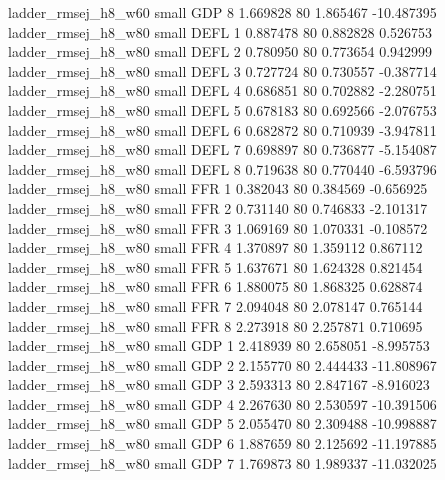      ladder_rmsej_h8_w60      small      GDP                 8 1.669828 80       1.865467         -10.487395
     ladder_rmsej_h8_w80      small     DEFL                 1 0.887478 80       0.882828           0.526753
     ladder_rmsej_h8_w80      small     DEFL                 2 0.780950 80       0.773654           0.942999
     ladder_rmsej_h8_w80      small     DEFL                 3 0.727724 80       0.730557          -0.387714
     ladder_rmsej_h8_w80      small     DEFL                 4 0.686851 80       0.702882          -2.280751
     ladder_rmsej_h8_w80      small     DEFL                 5 0.678183 80       0.692566          -2.076753
     ladder_rmsej_h8_w80      small     DEFL                 6 0.682872 80       0.710939          -3.947811
     ladder_rmsej_h8_w80      small     DEFL                 7 0.698897 80       0.736877          -5.154087
     ladder_rmsej_h8_w80      small     DEFL                 8 0.719638 80       0.770440          -6.593796
     ladder_rmsej_h8_w80      small      FFR                 1 0.382043 80       0.384569          -0.656925
     ladder_rmsej_h8_w80      small      FFR                 2 0.731140 80       0.746833          -2.101317
     ladder_rmsej_h8_w80      small      FFR                 3 1.069169 80       1.070331          -0.108572
     ladder_rmsej_h8_w80      small      FFR                 4 1.370897 80       1.359112           0.867112
     ladder_rmsej_h8_w80      small      FFR                 5 1.637671 80       1.624328           0.821454
     ladder_rmsej_h8_w80      small      FFR                 6 1.880075 80       1.868325           0.628874
     ladder_rmsej_h8_w80      small      FFR                 7 2.094048 80       2.078147           0.765144
     ladder_rmsej_h8_w80      small      FFR                 8 2.273918 80       2.257871           0.710695
     ladder_rmsej_h8_w80      small      GDP                 1 2.418939 80       2.658051          -8.995753
     ladder_rmsej_h8_w80      small      GDP                 2 2.155770 80       2.444433         -11.808967
     ladder_rmsej_h8_w80      small      GDP                 3 2.593313 80       2.847167          -8.916023
     ladder_rmsej_h8_w80      small      GDP                 4 2.267630 80       2.530597         -10.391506
     ladder_rmsej_h8_w80      small      GDP                 5 2.055470 80       2.309488         -10.998887
     ladder_rmsej_h8_w80      small      GDP                 6 1.887659 80       2.125692         -11.197885
     ladder_rmsej_h8_w80      small      GDP                 7 1.769873 80       1.989337         -11.032025
